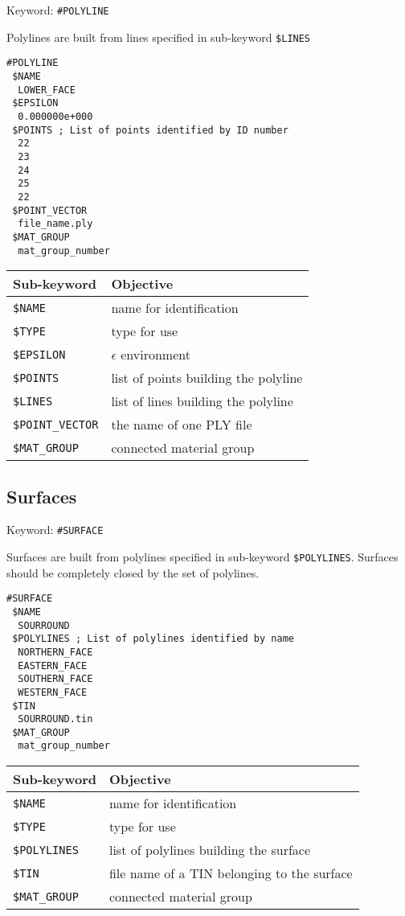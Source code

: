 Keyword: \texttt{\#POLYLINE}

Polylines are built from lines specified in sub-keyword
\texttt{\$LINES}

\small
\begin{verbatim}
#POLYLINE
 $NAME
  LOWER_FACE
 $EPSILON
  0.000000e+000
 $POINTS ; List of points identified by ID number
  22
  23
  24
  25
  22
 $POINT_VECTOR
  file_name.ply
 $MAT_GROUP
  mat_group_number
\end{verbatim}
\normalsize

\begin{center}
\begin{tabular}{|l|l|}
\hline
Sub-keyword & Objective \\
\hline \hline
%
\texttt{\$NAME}    &  name for identification \\
\texttt{\$TYPE}    &  type for use \\
\texttt{\$EPSILON} &  $\epsilon$ environment \\
\texttt{\$POINTS}   &  list of points building the polyline \\
\texttt{\$LINES}   &  list of lines building the polyline \\
\texttt{\$POINT\_VECTOR}   &  the name of one PLY file \\
\texttt{\$MAT\_GROUP}   &  connected material group \\
 \hline
\end{tabular}
\end{center}

\subsection{Surfaces}

Keyword: \texttt{\#SURFACE}

Surfaces are built from polylines specified in sub-keyword
\texttt{\$POLYLINES}. Surfaces should be completely closed by the
set of polylines.

\small
\begin{verbatim}
#SURFACE
 $NAME
  SOURROUND
 $POLYLINES ; List of polylines identified by name
  NORTHERN_FACE
  EASTERN_FACE
  SOUTHERN_FACE
  WESTERN_FACE
 $TIN
  SOURROUND.tin
 $MAT_GROUP
  mat_group_number
\end{verbatim}
\normalsize

\begin{center}
\begin{tabular}{|l|l|}
\hline
Sub-keyword & Objective \\
\hline \hline
%
\texttt{\$NAME}    &  name for identification \\
\texttt{\$TYPE}    &  type for use \\
\texttt{\$POLYLINES}  &  list of polylines building the surface \\
\texttt{\$TIN}    &   file name of a TIN belonging to the surface \\
\texttt{\$MAT\_GROUP}   &  connected material group \\
\hline
\end{tabular}
\end{center}

